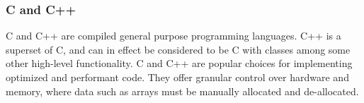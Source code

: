 \subsubsection{C and C++} \label{background:implementation_tools_and_libraries:c_and_cpp}
C and C++ are compiled general purpose programming languages.
C++ is a superset of C, and can in effect be considered to be C with classes among some other high-level functionality.
C and C++ are popular choices for implementing optimized and performant code.
They offer granular control over hardware and memory, where data such as arrays must be manually allocated and de-allocated.
